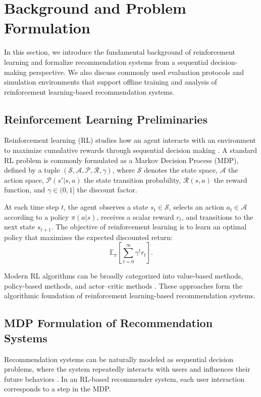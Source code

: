 \section{Background and Problem Formulation}

In this section, we introduce the fundamental background of reinforcement learning and formalize recommendation systems from a sequential decision-making perspective. We also discuss commonly used evaluation protocols and simulation environments that support offline training and analysis of reinforcement learning-based recommendation systems.

\subsection{Reinforcement Learning Preliminaries}

Reinforcement learning (RL) studies how an agent interacts with an environment to maximize cumulative rewards through sequential decision making \cite{Sutton1998RL}. A standard RL problem is commonly formulated as a Markov Decision Process (MDP), defined by a tuple $(\mathcal{S}, \mathcal{A}, \mathcal{P}, \mathcal{R}, \gamma)$, where $\mathcal{S}$ denotes the state space, $\mathcal{A}$ the action space, $\mathcal{P}(s'|s,a)$ the state transition probability, $\mathcal{R}(s,a)$ the reward function, and $\gamma \in (0,1]$ the discount factor.

At each time step $t$, the agent observes a state $s_t \in \mathcal{S}$, selects an action $a_t \in \mathcal{A}$ according to a policy $\pi(a|s)$, receives a scalar reward $r_t$, and transitions to the next state $s_{t+1}$. The objective of reinforcement learning is to learn an optimal policy that maximizes the expected discounted return:
\begin{equation}
\mathbb{E}_{\pi} \left[ \sum_{t=0}^{\infty} \gamma^t r_t \right].
\end{equation}

Modern RL algorithms can be broadly categorized into value-based methods, policy-based methods, and actor--critic methods \cite{Mnih2015DQN, Lillicrap2016DDPG}. These approaches form the algorithmic foundation of reinforcement learning-based recommendation systems.

\subsection{MDP Formulation of Recommendation Systems}

Recommendation systems can be naturally modeled as sequential decision problems, where the system repeatedly interacts with users and influences their future behaviors \cite{Shani2005MDP}. In an RL-based recommender system, each user interaction corresponds to a step in the MDP.

